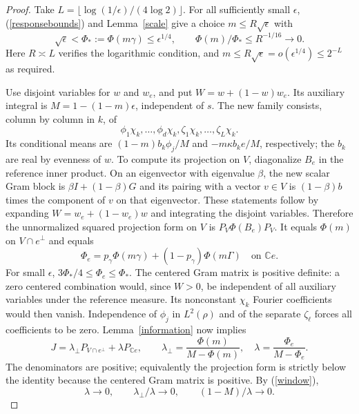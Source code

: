 \documentclass[reqno,a4paper,12pt]{amsart}
\newcommand{\C}{\mathbb C}
\begin{document}
\begin{proof}
Take $L=\lfloor\log(1/\epsilon)/(4\log2)\rfloor$.
For all sufficiently small $\epsilon$, (\ref{responsebounds}) and
Lemma~\ref{scale} give a choice $m\le R\sqrt\epsilon$ with
\begin{equation}\label{window}
 \sqrt\epsilon<\Phi_*:=\Phi(m\gamma)\le\epsilon^{1/4},\qquad
 \Phi(m)/\Phi_*\le R^{-1/16}\longrightarrow0.
\end{equation}
Here $R\asymp L$ verifies the logarithmic condition, and
$m\le R\sqrt\epsilon=o(\epsilon^{1/4})\le2^{-L}$ as required.

Use disjoint variables for $w$ and $w_e$, and put
$W=w+(1-w)w_e$. Its auxiliary integral is
$M=1-(1-m)\epsilon$, independent of $s$.
The new family consists, column by column in $k$, of
\[
 \phi_1\chi_k,\ldots,\phi_d\chi_k,
 \zeta_1\chi_k,\ldots,\zeta_L\chi_k.
\]
Its conditional means are $(1-m)b_k\phi_j/M$ and
$-m\kappa b_ke/M$, respectively; the $b_k$ are real by evenness of $w$.
To compute its projection on $V$, diagonalize $B_e$ in the reference
inner product. On an eigenvector with eigenvalue $\beta$, the new
scalar Gram block is $\beta I+(1-\beta)G$ and its pairing with a
vector $v\in V$ is $(1-\beta)b$ times the component of $v$ on that
eigenvector. These statements follow by expanding
$W=w_e+(1-w_e)w$ and integrating the disjoint variables.
Therefore the unnormalized squared projection form on $V$ is
$P_V\Phi(B_e)P_V$. It equals $\Phi(m)$ on $V\cap e^\perp$ and equals
\[
 \Phi_e=p_\gamma\Phi(m\gamma)+(1-p_\gamma)\Phi(m\Gamma)
 \quad\text{on }\C e.
\]
For small $\epsilon$, $3\Phi_*/4\le\Phi_e\le\Phi_*$.
The centered Gram matrix is positive definite: a zero centered
combination would, since $W>0$, be independent of all auxiliary
variables under the reference measure. Its nonconstant $\chi_k$
Fourier coefficients would then vanish. Independence of $\phi_j$ in
$L^2(\rho)$ and of the separate $\zeta_\ell$ forces all coefficients
to be zero. Lemma~\ref{information} now implies
\[
 J=\lambda_\perp P_{V\cap e^\perp}+\lambda P_{\C e},\qquad
 \lambda_\perp=\frac{\Phi(m)}{M-\Phi(m)},\quad
 \lambda=\frac{\Phi_e}{M-\Phi_e}.
\]
The denominators are positive; equivalently the projection form is
strictly below the identity because the centered Gram matrix is positive.
By (\ref{window}),
\begin{equation}\label{selectivelimits}
 \lambda\to0,\qquad \lambda_\perp/\lambda\to0,\qquad
 (1-M)/\lambda\to0.
\end{equation}


\end{proof}
\end{document}
